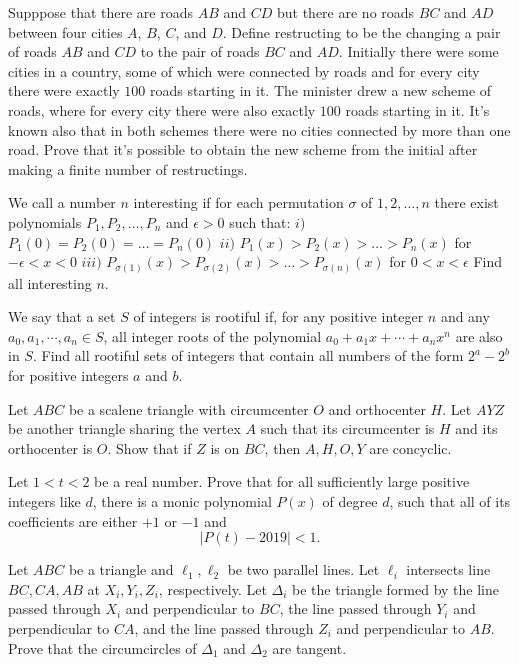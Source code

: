 \documentclass[11pt]{scrartcl}
\begin{document}
\begin{problem}[4875666253256352039]
Supppose that there are roads $AB$ and $CD$ but there are no roads $BC$ and $AD$ between four cities $A$, $B$, $C$, and $D$. Define restructing to be the changing a pair of roads $AB$ and $CD$ to the pair of roads $BC$ and $AD$. Initially there were some cities in a country, some of which were connected by roads and for every city there were exactly $100$ roads starting in it. The minister drew a new scheme of roads, where for every city there were also exactly $100$ roads starting in it. It's known also that in both schemes there were no cities connected by more than one road.
Prove that it's possible to obtain the new scheme from the initial after making a finite number of restructings.
\end{problem}
\begin{problem}[4885001410726383269]
	We call a number $n$ interesting if for each permutation $\sigma$ of $1,2,\ldots,n$ there exist polynomials $P_1,P_2,\ldots ,P_n$ and $\epsilon > 0$ such that:
$i)$ $P_1(0)=P_2(0)=\ldots =P_n(0)$
$ii)$ $P_1(x)>P_2(x)>\ldots >P_n(x)$ for $-\epsilon<x<0$
$iii)$ $P_{\sigma (1)} (x)>P_{\sigma (2)}(x)> \ldots >P_{\sigma (n)} (x) $ for $0<x<\epsilon$
Find all interesting $n$.
\end{problem}
\begin{problem}[4892352754475215646]
	We say that a set $S$ of integers is rootiful if, for any positive integer $n$ and any $a_0, a_1, \cdots, a_n \in S$, all integer roots of the polynomial $a_0+a_1x+\cdots+a_nx^n$ are also in $S$. Find all rootiful sets of integers that contain all numbers of the form $2^a - 2^b$ for positive integers $a$ and $b$.
\end{problem}
\begin{problem}[4948608980214807448]
	Let $ABC$ be a scalene triangle with circumcenter $O$ and orthocenter $H$. Let $AYZ$ be another triangle sharing the vertex $A$ such that its circumcenter is $H$ and its orthocenter is $O$. Show that if $Z$ is on $BC$, then $A,H,O,Y$ are concyclic.
\end{problem}
\begin{problem}[4953306346525230082]
Let $1<t<2$ be a real number. Prove that for all sufficiently large positive integers like $d$, there is a monic polynomial $P(x)$ of degree $d$, such that all of its coefficients are either $+1$ or $-1$ and
$$\left|P(t)-2019\right| <1.$$
\end{problem}
\begin{problem}[4992489807901310938]
Let $ABC$ be a triangle and $\ell_1,\ell_2$ be two parallel lines. Let $\ell_i$ intersects line $BC,CA,AB$ at $X_i,Y_i,Z_i$, respectively. Let $\Delta_i$ be the triangle formed by the line passed through $X_i$ and perpendicular to $BC$, the line passed through $Y_i$ and perpendicular to $CA$, and the line passed through $Z_i$ and perpendicular to $AB$. Prove that the circumcircles of $\Delta_1$ and $\Delta_2$ are tangent.
\end{problem}
\end{document}

